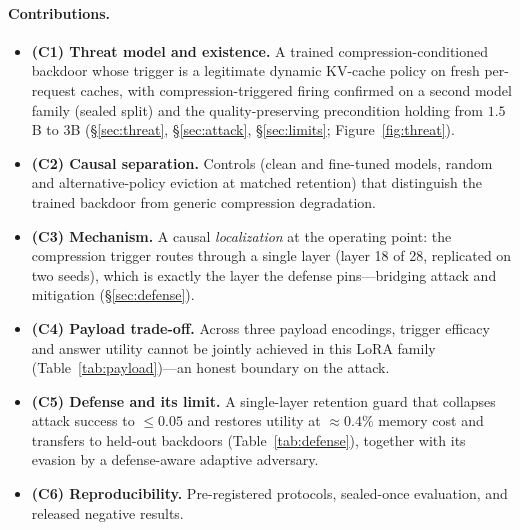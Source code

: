 \documentclass[11pt]{article}
\begin{document}
\paragraph{Contributions.}
\begin{itemize}
  \item \textbf{(C1) Threat model and existence.} A trained
  compression-conditioned backdoor whose trigger is a legitimate dynamic
  KV-cache policy on fresh per-request caches, with compression-triggered firing
  confirmed on a second model family (sealed split) and the quality-preserving
  precondition holding from $1.5$B to $3$B (\S\ref{sec:threat},
  \S\ref{sec:attack}, \S\ref{sec:limits}; Figure~\ref{fig:threat}).
  \item \textbf{(C2) Causal separation.} Controls (clean and fine-tuned models,
  random and alternative-policy eviction at matched retention) that distinguish
  the trained backdoor from generic compression degradation.
  \item \textbf{(C3) Mechanism.} A causal \emph{localization} at the operating
  point: the compression trigger routes through a single layer (layer 18 of 28,
  replicated on two seeds), which is exactly the layer the defense pins---bridging
  attack and mitigation (\S\ref{sec:defense}).
  \item \textbf{(C4) Payload trade-off.} Across three payload encodings, trigger
  efficacy and answer utility cannot be jointly achieved in this LoRA family
  (Table~\ref{tab:payload})---an honest boundary on the attack.
  \item \textbf{(C5) Defense and its limit.} A single-layer retention guard that
  collapses attack success to $\le 0.05$ and restores utility at
  $\approx\!0.4\%$ memory cost and transfers to held-out backdoors
  (Table~\ref{tab:defense}), together with its evasion by a defense-aware
  adaptive adversary.
  \item \textbf{(C6) Reproducibility.} Pre-registered protocols, sealed-once
  evaluation, and released negative results.
\end{itemize}
\end{document}
